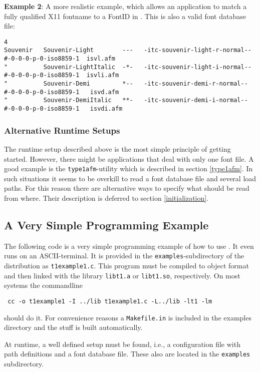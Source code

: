 {\bfseries Example 2}: A more
realistic example, which allows an application to match a fully
qualified X11 fontname to a FontID in \tonelib. This is also a
valid font database file:

{\footnotesize\hfuzz=30pt\relax
\begin{verbatim}
4
Souvenir   Souvenir-Light        ---   -itc-souvenir-light-r-normal--#-0-0-0-p-0-iso8859-1  isvl.afm
"          Souvenir-LightItalic  -*-   -itc-souvenir-light-i-normal--#-0-0-0-p-0-iso8859-1  isvli.afm
"          Souvenir-Demi         *--   -itc-souvenir-demi-r-normal--#-0-0-0-p-0-iso8859-1   isvd.afm
"          Souvenir-DemiItalic   **-   -itc-souvenir-demi-i-normal--#-0-0-0-p-0-iso8859-1   isvdi.afm
\end{verbatim}
}%

\subsubsection{Alternative Runtime Setups}
The runtime setup described above is the most simple principle of
getting started. However, there might be applications that deal with
only one font file. A good example is the \verb+type1afm+-utility
which is described in section \ref{type1afm}. In such situations it seems to
be overkill to read a font database file and several load paths. For
this reason there are alternative ways to specify what should be read
from where. Their description is deferred to section
\ref{initialization}.   

\subsection{A Very Simple Programming Example}
\label{programmingexample}
The following code is a very simple programming example of how to use
\tonelib. It even runs on an ASCII-terminal. It is provided in the
\verb+examples+-subdirectory of the distribution as \verb+t1example1.c+.
This program must be compiled to object format and then linked with
the library \verb+libt1.a+ or \verb+libt1.so+, respectively. On most systems
the commandline 
\begin{verbatim}
 cc -o t1example1 -I ../lib t1example1.c -L../lib -lt1 -lm
\end{verbatim}
should do it. For convenience reasons a \verb+Makefile.in+ is included in the
examples directory and the stuff is built automatically. 

At runtime, a
well defined setup must be found, i.e., a configuration file with path
definitions and a font database file. These also are located in the
\verb+examples+ subdirectory.


